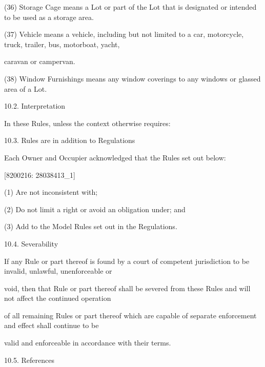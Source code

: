 \documentclass{article}
\begin{document}
{\fontsize{9.962}{1}(36) Storage Cage means a Lot or part of the Lot that is designated or intended to be used as a storage area. }

{\fontsize{9.962}{1}(37) Vehicle means a vehicle, including but not limited to a car, motorcycle, truck, trailer, bus, motorboat, yacht, }

{\fontsize{10.02}{1}caravan or campervan. }

{\fontsize{9.962}{1}(38) Window Furnishings means any window coverings to any windows or glassed area of a Lot. }

{\fontsize{9.99}{1}10.2. Interpretation }

{\fontsize{10.02}{1}In these Rules, unless the context otherwise requires: }

{\fontsize{9.99}{1}10.3. Rules are in addition to Regulations }

{\fontsize{10.02}{1}Each Owner and Occupier acknowledged that the Rules set out below: }

\newpage
















{\fontsize{7.02}{1}[8200216: 28038413\_1] }

{\fontsize{9.962}{1}(1) Are not inconsistent with; }

{\fontsize{9.962}{1}(2) Do not limit a right or avoid an obligation under; and }

{\fontsize{9.962}{1}(3) Add to the Model Rules set out in the Regulations. }

{\fontsize{9.99}{1}10.4. Severability }


{\fontsize{10.02}{1}If any Rule or part thereof is found by a court of competent jurisdiction to be invalid, unlawful, unenforceable or }

{\fontsize{10.02}{1}void, then that Rule or part thereof shall be severed from these Rules and will not affect the continued operation }

{\fontsize{10.02}{1}of all remaining Rules or part thereof which are capable of separate enforcement and effect shall continue to be }

{\fontsize{10.02}{1}valid and enforceable in accordance with their terms. }

{\fontsize{9.99}{1}10.5. References }
\end{document}
